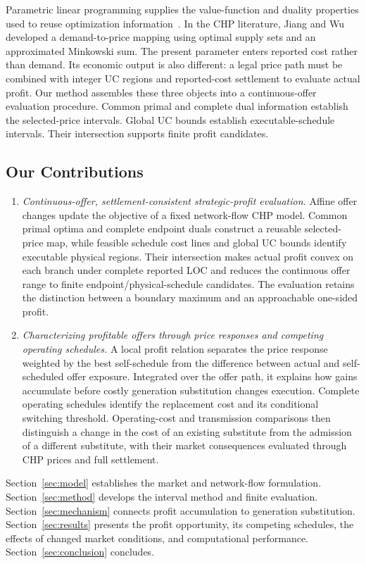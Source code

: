 \documentclass[journal]{IEEEtran}
\begin{document}
Parametric linear programming supplies the value-function and duality properties used to reuse optimization information~\cite{bertsimas1997}. In the CHP literature, Jiang and Wu~\cite{jiang2026minkowski} developed a demand-to-price mapping using optimal supply sets and an approximated Minkowski sum. The present parameter enters reported cost rather than demand. Its economic output is also different: a legal price path must be combined with integer UC regions and reported-cost settlement to evaluate actual profit. Our method assembles these three objects into a continuous-offer evaluation procedure. Common primal and complete dual information establish the selected-price intervals. Global UC bounds establish executable-schedule intervals. Their intersection supports finite profit candidates.

\subsection{Our Contributions}
\begin{enumerate}
\item \emph{Continuous-offer, settlement-consistent strategic-profit evaluation.} Affine offer changes update the objective of a fixed network-flow CHP model. Common primal optima and complete endpoint duals construct a reusable selected-price map, while feasible schedule cost lines and global UC bounds identify executable physical regions. Their intersection makes actual profit convex on each branch under complete reported LOC and reduces the continuous offer range to finite endpoint/physical-schedule candidates. The evaluation retains the distinction between a boundary maximum and an approachable one-sided profit.
\item \emph{Characterizing profitable offers through price responses and competing operating schedules.} A local profit relation separates the price response weighted by the best self-schedule from the difference between actual and self-scheduled offer exposure. Integrated over the offer path, it explains how gains accumulate before costly generation substitution changes execution. Complete operating schedules identify the replacement cost and its conditional switching threshold. Operating-cost and transmission comparisons then distinguish a change in the cost of an existing substitute from the admission of a different substitute, with their market consequences evaluated through CHP prices and full settlement.
\end{enumerate}
Section~\ref{sec:model} establishes the market and network-flow formulation. Section~\ref{sec:method} develops the interval method and finite evaluation. Section~\ref{sec:mechanism} connects profit accumulation to generation substitution. Section~\ref{sec:results} presents the profit opportunity, its competing schedules, the effects of changed market conditions, and computational performance. Section~\ref{sec:conclusion} concludes.
\end{document}
